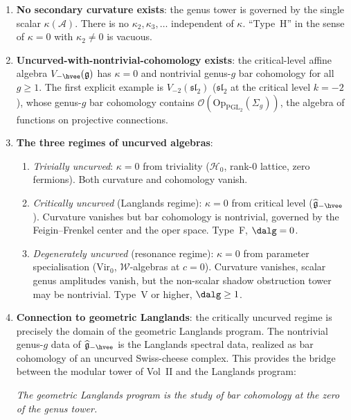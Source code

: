 \documentclass[11pt]{article}
\newcommand{\cA}{\mathcal{A}}
\newcommand{\cO}{\mathcal{O}}
\newcommand{\cW}{\mathcal{W}}
\newcommand{\cH}{\mathcal{H}}
\newcommand{\fg}{\mathfrak{g}}
\newcommand{\fsl}{\mathfrak{sl}}
\begin{document}
\begin{theorem}
\label{thm:type-H-resolution}
\begin{enumerate}[label=\textup{(\roman*)}]
\item \textbf{No secondary curvature exists}: the genus tower
  is governed by the single scalar $\kappa(\cA)$.  There is no
  $\kappa_2, \kappa_3, \ldots$ independent of $\kappa$.
  ``Type~H'' in the sense of $\kappa = 0$ with $\kappa_2 \neq 0$
  is vacuous.
\item \textbf{Uncurved-with-nontrivial-cohomology exists}: the
  critical-level affine algebra $V_{-\hvee}(\fg)$ has
  $\kappa = 0$ and nontrivial genus-$g$ bar cohomology for all
  $g \geq 1$.  The first explicit example is
  $V_{-2}(\fsl_2)$ \textup{(}$\fsl_2$ at the critical level
  $k = -2$\textup{)}, whose genus-$g$ bar cohomology contains
  $\cO(\mathrm{Op}_{\mathrm{PGL}_2}(\Sigma_g))$, the algebra
  of functions on projective connections.
\item \textbf{The three regimes of uncurved algebras}:
  \begin{enumerate}[label=\textup{(\alph*)}]
  \item \emph{Trivially uncurved}: $\kappa = 0$ from triviality
    ($\cH_0$, rank-$0$ lattice, zero fermions).  Both curvature
    and cohomology vanish.
  \item \emph{Critically uncurved} \textup{(}Langlands regime\textup{)}:
    $\kappa = 0$ from critical level
    ($\widehat{\fg}_{-\hvee}$).
    Curvature vanishes but bar cohomology is nontrivial,
    governed by the Feigin--Frenkel center and the oper space.
    Type~F, $\dalg = 0$.
  \item \emph{Degenerately uncurved} \textup{(}resonance regime\textup{)}:
    $\kappa = 0$ from parameter specialisation
    ($\mathrm{Vir}_0$, $\cW$-algebras at $c = 0$).
    Curvature vanishes, scalar genus amplitudes vanish, but the
    non-scalar shadow obstruction tower may be nontrivial.  Type~V or higher,
    $\dalg \geq 1$.
  \end{enumerate}
\item \textbf{Connection to geometric Langlands}: the critically
  uncurved regime is precisely the domain of the geometric
  Langlands program.  The nontrivial genus-$g$ data of
  $\widehat{\fg}_{-\hvee}$ is the Langlands spectral data,
  realized as bar cohomology of an uncurved Swiss-cheese complex.
  This provides the
  bridge between the modular tower of Vol~II and the Langlands
  program:
  \begin{center}
  \emph{The geometric Langlands program is the study of bar
  cohomology at the zero of the genus tower.}
  \end{center}
\end{enumerate}
\end{theorem}
\end{document}
